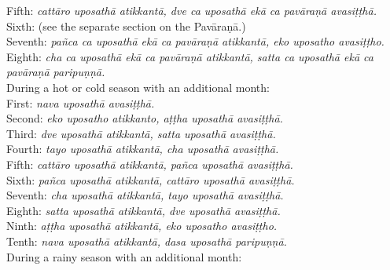 {{{{{					\hspace*{0.5em}Fifth: \textit{cattāro uposathā atikkantā, dve ca uposathā ekā ca pavāraṇā avasiṭṭhā.}\\
					\hspace*{0.5em}Sixth: (see the separate section on the Pavāraṇā.)\\
					\hspace*{0.5em}Seventh: \textit{pañca ca uposathā ekā ca pavāraṇā atikkantā, eko uposatho avasiṭṭho.}\\
					\hspace*{0.5em}Eighth: \textit{cha ca uposathā ekā ca pavāraṇā atikkantā, satta ca uposathā ekā ca pavāraṇā paripuṇṇā.}\smallskip \\
					During a hot or cold season with an additional month:\\
					\hspace*{0.5em}First: \textit{nava uposathā avasiṭṭhā.}\\
					\hspace*{0.5em}Second: \textit{eko uposatho atikkanto, aṭṭha uposathā avasiṭṭhā.}\\
					\hspace*{0.5em}Third: \textit{dve uposathā atikkantā, satta uposathā avasiṭṭhā.}\\
					\hspace*{0.5em}Fourth: \textit{tayo uposathā atikkantā, cha uposathā avasiṭṭhā.}\\
					\hspace*{0.5em}Fifth: \textit{cattāro uposathā atikkantā, pañca uposathā avasiṭṭhā.}\\
					\hspace*{0.5em}Sixth: \textit{pañca uposathā atikkantā, cattāro uposathā avasiṭṭhā.}\\
					\hspace*{0.5em}Seventh: \textit{cha uposathā atikkantā, tayo uposathā avasiṭṭhā.}\\
					\hspace*{0.5em}Eighth: \textit{satta uposathā atikkantā, dve uposathā avasiṭṭhā.}\\
					\hspace*{0.5em}Ninth: \textit{aṭṭha uposathā atikkantā, eko uposatho avasiṭṭho.}\\
					\hspace*{0.5em}Tenth: \textit{nava uposathā atikkantā, dasa uposathā paripuṇṇā.}\\
					\smallskip
					During a rainy season with an additional month:\\
}}}}}
